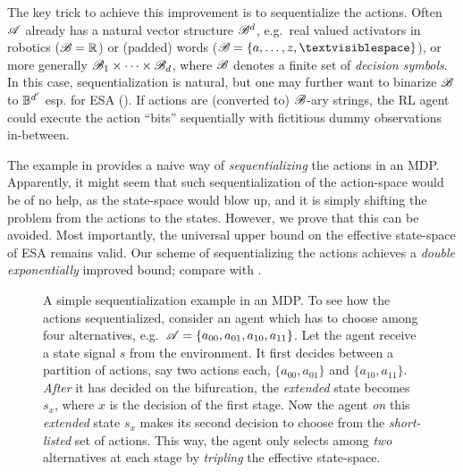 \documentclass{article} %
\begin{document}
The key trick to achieve this improvement is to sequentialize the actions. Often $\mathscr{A}$ already has a natural vector structure $\mathscr{B}^d$, e.g.\ real valued activators in robotics ($\mathscr{B} = \mathbb{R}$) or (padded) words ($\B = \{a, \dots, z, \textvisiblespace\}$), or more generally $\mathscr{B}_1 \times \dots \times \mathscr{B}_d$, where $\mathscr{B}$ denotes a finite set of \emph{decision symbols}.
In this case, sequentialization is natural, but one may further want to binarize $\mathscr{B}$ to $\mathbb{B}^{d'}$ esp. for ESA ().
If actions are (converted to) $\mathscr{B}$-ary strings,
the RL agent could execute the action ``bits'' sequentially with fictitious dummy observations in-between.

The example in  provides a naive way of \emph{sequentializing} the actions in an MDP. Apparently, it might seem that such sequentialization of the action-space would be of no help, as the state-space would blow up, and it is simply shifting the problem from the actions to the states. However, we prove that this can be avoided. Most importantly, the universal upper bound on the effective state-space of ESA remains valid. Our scheme of sequentializing the actions achieves a \emph{double exponentially} improved bound; compare  with .

\begin{figure}[h]
\centering
{}
\caption{A simple sequentialization example in an MDP. To see how the actions sequentialized, consider an agent which has to choose among four alternatives, e.g.\ $\mathscr{A} = \{a_{00}, a_{01}, a_{10}, a_{11}\}$. Let the agent receive a state signal $s$ from the environment. It first decides between a partition of actions, say two actions each, $\{a_{00}, a_{01}\}$ and $\{a_{10}, a_{11}\}$. \emph{After} it has decided on the bifurcation, the \emph{extended} state becomes $s_x$, where $x$ is the decision of the first stage. Now the agent \emph{on} this \emph{extended} state $s_x$ makes its second decision to choose from the \emph{short-listed} set of actions. This way, the agent only selects among \emph{two} alternatives at each stage by \emph{tripling} the effective state-space.}
\label{fig:example}
\end{figure}
\end{document}
